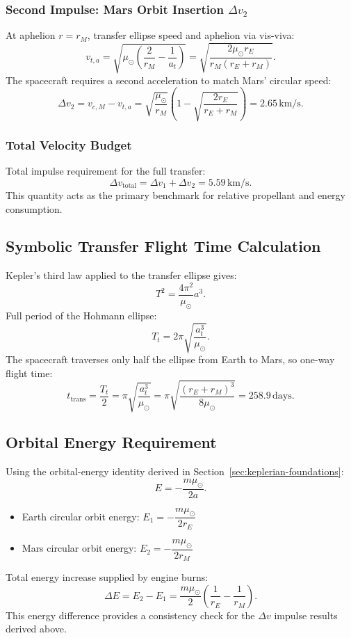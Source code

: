 \documentclass[11pt,a4paper]{article}
\begin{document}
\subsubsection{Second Impulse: Mars Orbit Insertion $\Delta v_2$}
At aphelion $r=r_M$, transfer ellipse speed and aphelion via vis-viva:
\[
v_{t,a}=\sqrt{\mu_\odot\left(\frac{2}{r_M}-\frac{1}{a_t}\right)}=\sqrt{\frac{2\mu_\odot r_E}{r_M(r_E+r_M)}}.
\]
The spacecraft requires a second acceleration to match Mars’ circular speed:
\[
\Delta v_2=v_{c,M}-v_{t,a}=\sqrt{\frac{\mu_\odot}{r_M}}\left(1-\sqrt{\frac{2r_E}{r_E+r_M}}\right)=2.65\, \text{km/s}.
\]

\subsubsection{Total Velocity Budget}
Total impulse requirement for the full transfer:
\[
\Delta v_{\text{total}}=\Delta v_1+\Delta v_2=5.59\, \text{km/s}.
\]
This quantity acts as the primary benchmark for relative propellant and energy consumption.

\subsection{Symbolic Transfer Flight Time Calculation}
Kepler's third law applied to the transfer ellipse gives:
\[
T^2=\frac{4\pi^2}{\mu_\odot}a^3.
\]
Full period of the Hohmann ellipse:
\[
T_t=2\pi\sqrt{\frac{a_t^3}{\mu_\odot}}.
\]
The spacecraft traverses only half the ellipse from Earth to Mars, so one-way flight time:
\[
t_{\text{trans}}=\frac{T_t}{2}=\pi\sqrt{\frac{a_t^3}{\mu_\odot}}=\pi\sqrt{\frac{(r_E+r_M)^3}{8\mu_\odot}}=258.9 \, \text{days}.
\]

\subsection{Orbital Energy Requirement}
Using the orbital-energy identity derived in Section~\ref{sec:keplerian-foundations}:
\[
E=-\frac{m\mu_\odot}{2a}.
\]
\begin{itemize}
    \item Earth circular orbit energy: $E_1=-\dfrac{m\mu_\odot}{2r_E}$
    \item Mars circular orbit energy: $E_2=-\dfrac{m\mu_\odot}{2r_M}$
\end{itemize}
Total energy increase supplied by engine burns:
\[
\Delta E=E_2-E_1=\frac{m\mu_\odot}{2}\left(\frac{1}{r_E}-\frac{1}{r_M}\right).
\]
This energy difference provides a consistency check for the $\Delta v$ impulse results derived above.
\end{document}

